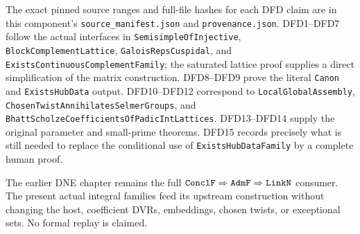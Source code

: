 The exact pinned source ranges and full-file hashes for
each DFD claim are in this component's
\texttt{source\_\allowbreak manifest.json} and \texttt{provenance.json}.
DFD1--DFD7 follow the actual interfaces in
\texttt{Semisimple\allowbreak Of\allowbreak Injective},
\texttt{Block\allowbreak Complement\allowbreak Lattice},
\texttt{Galois\allowbreak Reps\allowbreak Cuspidal}, and
\texttt{Exists\allowbreak Continuous\allowbreak Complement\allowbreak Family}; the saturated
lattice proof supplies a direct simplification of the
matrix construction. DFD8--DFD9 prove the literal
\texttt{Canon} and \texttt{Exists\allowbreak Hub\allowbreak Data} output.
DFD10--DFD12 correspond to \texttt{Local\allowbreak Global\allowbreak Assembly},
\texttt{Chosen\allowbreak Twist\allowbreak Annihilates\allowbreak Selmer\allowbreak Groups}, and
\texttt{Bhatt\allowbreak Scholze\allowbreak Coefficients\allowbreak Of\allowbreak Padic\allowbreak Int\allowbreak Lattices}.
DFD13--DFD14 supply the original parameter and small-prime
theorems. DFD15 records precisely what is still needed
to replace the conditional use of
\texttt{Exists\allowbreak Hub\allowbreak Data\allowbreak Family} by a complete human proof.

The earlier DNE chapter remains the full
$\texttt{Concl\allowbreak F}\Rightarrow\texttt{Adm\allowbreak F}\Rightarrow
\texttt{Link\allowbreak N}$ consumer. The present actual integral
families feed its upstream construction without changing
the host, coefficient DVRs, embeddings, chosen twists,
or exceptional sets. No formal replay is claimed.
